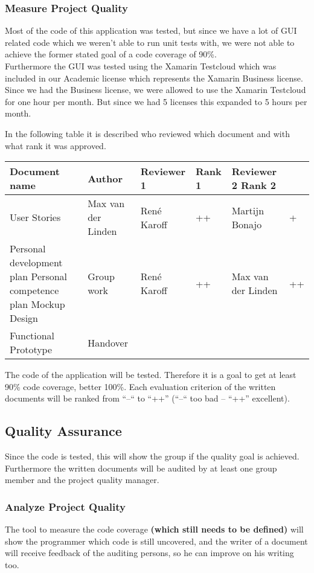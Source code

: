 \subsubsection{Measure Project Quality}
Most of the code of this application was tested, but since we have a lot of GUI related code which we weren't able to run unit tests with, we were not able to achieve the former stated goal of a code coverage of 90\%. \\
Furthermore the GUI was tested using the Xamarin Testcloud which was included in our Academic license which represents the Xamarin Business license. Since we had the Business license, we were allowed to use the Xamarin Testcloud for one hour per month. But since we had 5 licenses this expanded to 5 hours per month.

In the following table it is described who reviewed which document and with what rank it was approved.
\begin{table}[htbp]
	\begin{tabular}{ p{\textwidth} p{\textwidth} p{\textwidth} p{\textwidth} p{\textwidth} }
		\textbf{Document name} & Author & \textbf{Reviewer 1} & \textbf{Rank 1} & \textbf{Reviewer 2} \textbf{Rank 2}\\ \hline
		User Stories & Max van der Linden & René Karoff & ++ & Martijn Bonajo & + \\
		Personal development plan 
		Personal competence plan
		Mockup Design & Group work & René Karoff & ++ & Max van der Linden & ++ \\
		Functional Prototype & 
		Handover
	\end{tabular}
\end{table}

The code of the application will be tested. Therefore it is a goal to get at least 90\% code coverage, better 100\%. Each evaluation criterion of the written documents will be ranked from “--“ to “++” (“--“ too bad – “++” excellent).
\subsection{Quality Assurance}
Since the code is tested, this will show the group if the quality goal is achieved. Furthermore the written documents will be audited by at least one group member and the project quality manager.
\subsubsection{Analyze Project Quality}
The tool to measure the code coverage \textbf{(which still needs to be defined)} will show the programmer which code is still uncovered, and the writer of a document will receive feedback of the auditing persons, so he can improve on his writing too.
